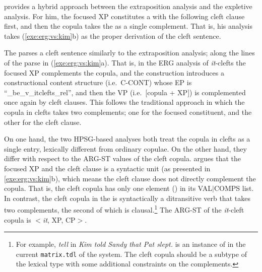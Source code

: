 

\noindent \citeauthor{kim:12a} provides a hybrid approach between the
extraposition analysis and the expletive analysis. For him, the
focused XP constitutes a  with the following cleft
clause first, and then the copula takes the  as a single
complement. That is, his analysis takes (\ref{exe:erg:vs:kim}b) as the
proper derivation of the cleft sentence.


The  parses a cleft sentence similarly to the extraposition
analysis; along the lines of the parse in
(\ref{exe:erg:vs:kim}a). That is, in the ERG analysis of
\textit{it}-clefts the focused XP complements the copula, and the
construction introduces a constructional content structure
(i.e.\ C-CONT) whose EP is ``\_be\_v\_itclefts\_rel'', and then the VP
(i.e.\ [copula + XP]) is complemented once again by cleft
clauses. This follows the traditional approach in which the copula in
clefts takes two complements; one for the focused constituent, and the
other for the cleft clause.




On one hand, the two HPSG-based analyses both treat the copula in
clefts as a single entry, lexically different from ordinary
copulae. On the other hand, they differ with respect to the ARG-ST
values of the cleft copula. \citet{kim:12a} argues that the
focused XP and the cleft clause is a syntactic unit (as presented in
\ref{exe:erg:vs:kim}b), which means the cleft clause does not directly
complement the copula. That is, the cleft copula has only one element
() in its \mbox{VAL{$\mid$}COMPS} list.  In contrast,
the cleft copula in the  is syntactically a ditransitive verb
that takes two complements, the second of which is
clausal.\footnote{For example, \textit{tell} in \textit{Kim told Sandy
    that Pat slept.} is an instance of
   in the current
  \texttt{matrix.tdl} of the \lingo {} system. The
  cleft copula should be a subtype of the lexical type with some
  additional constraints on the complements.} The ARG-ST of the
\textit{it}-cleft copula is \ensuremath{<}\textit{it}, XP,
CP\ensuremath{>}.



